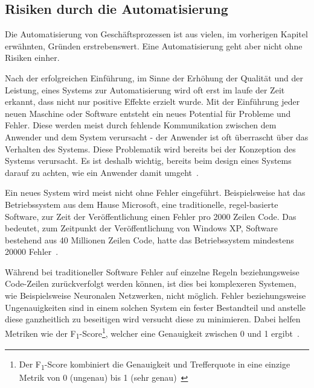\subsection{Risiken durch die Automatisierung}

Die Automatisierung von Geschäftsprozessen ist aus vielen, im vorherigen Kapitel erwähnten, Gründen erstrebenswert. Eine Automatisierung geht aber nicht ohne Risiken einher.



Nach der erfolgreichen Einführung, im Sinne der Erhöhung der Qualität und der Leistung, eines Systems zur Automatisierung wird oft erst im laufe der Zeit erkannt, dass nicht nur positive Effekte erzielt wurde. Mit der Einführung jeder neuen Maschine oder Software entsteht ein neues Potential für Probleme und Fehler. Diese werden meist durch fehlende Kommunikation zwischen dem Anwender und dem System verursacht - der Anwender ist oft überrascht über das Verhalten des Systems. Diese Problematik wird bereits bei der Konzeption des Systems verursacht. Es ist deshalb wichtig, bereits beim design eines Systems darauf zu achten, wie ein Anwender damit umgeht~\autocite{Sarter1997}. 

Ein neues System wird meist nicht ohne Fehler eingeführt. Beispielsweise hat das Betriebssystem aus dem Hause Microsoft, eine traditionelle, regel-basierte Software, zur Zeit der Veröffentlichung einen Fehler pro 2000 Zeilen Code. Das bedeutet, zum Zeitpunkt der Veröffentlichung von Windows XP, Software bestehend aus 40 Millionen Zeilen Code, hatte das Betriebssystem mindestens 20000 Fehler~\autocite{TheEconomist2010}. 

Während bei traditioneller Software Fehler auf einzelne Regeln beziehungsweise Code-Zeilen zurückverfolgt werden können, ist dies bei komplexeren Systemen, wie Beispielsweise Neuronalen Netzwerken, nicht möglich. Fehler beziehungsweise Ungenauigkeiten sind in einem solchen System ein fester Bestandteil und anstelle diese ganzheitlich zu beseitigen wird versucht diese zu minimieren. Dabei helfen Metriken wie der F\textsubscript{1}-Score\footnote{Der F\textsubscript{1}-Score kombiniert die Genauigkeit und Trefferquote in eine einzige Metrik von 0 (ungenau) bis 1 (sehr genau)~\autocite{VanRijsbergen1979}}, welcher eine Genauigkeit zwischen 0 und 1 ergibt~\autocite{VanRijsbergen1979}.

